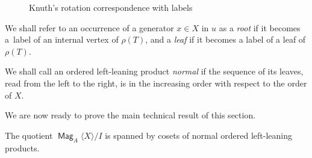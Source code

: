 \documentclass[AHL,Unicode,longabstracts]{cedram}
\DeclareMathOperator{\Mag}{\mathsf{Mag}}
\begin{document}
\begin{figure}[h]
\centering
{}
\caption{Knuth's rotation correspondence with labels}\label{fig2}
\end{figure}

We shall refer to an occurrence of a generator $x\in X$ in $u$ as a
\emph{root} if it becomes a~label of an internal vertex of $\rho(T)$, and a
\emph{leaf} if it becomes a label of a leaf of $\rho(T)$.

\begin{defi}\label{normal}
We shall call an ordered left-leaning product \emph{normal} if the sequence of its leaves, read from the left to the right, is in the increasing order with respect to the order of $X$.
\end{defi}

We are now ready to prove the main technical result of this section.

\begin{prop}\label{normal_coset}
The quotient $\Mag_A\langle X\rangle/I$ is spanned by cosets of normal ordered left-leaning products.
\end{prop}
\end{document}

